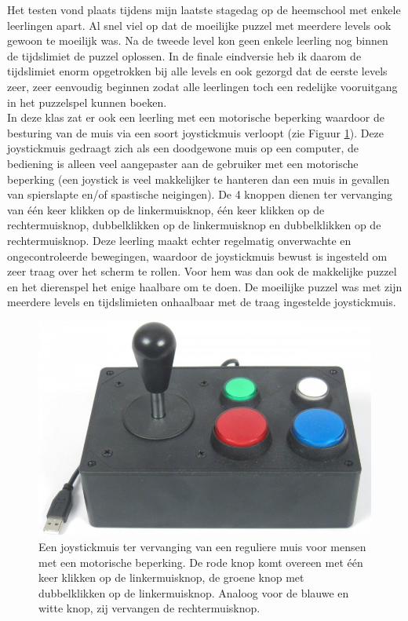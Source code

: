 \documentclass[a4paper,11pt]{article}
\theoremstyle{definition}
\begin{document}
\begin{itemize}
\begin{itemize}
\noindent Het testen vond plaats tijdens mijn laatste stagedag op de 
heemschool met enkele leerlingen apart. Al snel viel op dat de moeilijke puzzel 
met meerdere levels ook gewoon te moeilijk was. Na de tweede level kon geen 
enkele leerling nog binnen de tijdslimiet de puzzel oplossen. In de finale 
eindversie heb ik daarom de tijdslimiet enorm opgetrokken bij alle levels en ook 
gezorgd dat de eerste levels zeer, zeer eenvoudig beginnen zodat alle leerlingen 
toch een redelijke vooruitgang in het puzzelspel kunnen boeken. \\

\noindent In deze klas zat er ook een leerling met een motorische beperking 
waardoor de besturing van de muis via een soort joystickmuis verloopt (zie Figuur 
\ref{joy}). Deze joystickmuis gedraagt zich als een doodgewone muis op een 
computer, de bediening is alleen veel aangepaster aan de gebruiker met een 
motorische beperking (een joystick is veel makkelijker te hanteren dan een muis in gevallen van spierslapte en/of spastische neigingen). 
De 4 knoppen dienen ter vervanging van één keer klikken op de linkermuisknop, één 
keer klikken op de rechtermuisknop, dubbelklikken op de linkermuisknop en 
dubbelklikken op de rechtermuisknop.
Deze leerling maakt echter regelmatig onverwachte en ongecontroleerde 
bewegingen, waardoor de joystickmuis bewust is ingesteld om zeer traag over het 
scherm te rollen. Voor hem was dan ook de makkelijke puzzel en het dierenspel 
het enige haalbare om te doen. De moeilijke puzzel was met zijn meerdere levels 
en tijdslimieten onhaalbaar met de traag ingestelde joystickmuis.
 \begin{figure}[h!]
  \centering
  \includegraphics[scale=0.25]{joy.jpg}\caption{Een joystickmuis ter vervanging van een reguliere muis voor mensen met een motorische beperking. De rode knop komt overeen met één keer klikken op de linkermuisknop, de groene knop met dubbelklikken op de linkermuisknop. Analoog voor de blauwe en witte knop, zij vervangen de rechtermuisknop.}\label{joy}
\end{figure}



\end{itemize}
\end{itemize}
\end{document}
